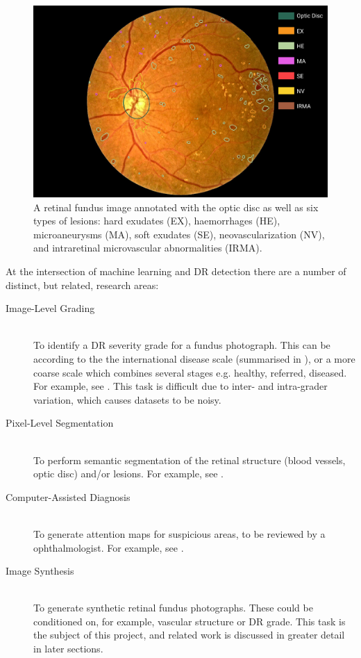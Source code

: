 \begin{figure}
    \centering
    \includegraphics[width=\linewidth]{background/figs/retina.pdf}
    \caption{A retinal fundus image annotated with the optic disc as well as six types of lesions: hard exudates (EX), haemorrhages (HE), microaneurysms (MA), soft exudates (SE), neovascularization (NV), and intraretinal microvascular abnormalities (IRMA).}
    \label{fig:lesions}
\end{figure}
At the intersection of machine learning and DR detection there are a number of distinct, but related, research areas:
\begin{description}
    \item[Image-Level Grading] \hfill \\ To identify a DR severity grade for a fundus photograph. This can be according to the the international disease scale (summarised in ), or a more coarse scale which combines several stages e.g. healthy, referred, diseased. For example, see \cite{Gulshan2016}. This task is difficult due to inter- and intra-grader variation, which causes datasets to be noisy.
    \item[Pixel-Level Segmentation] \hfill \\ To perform semantic segmentation of the retinal structure (blood vessels, optic disc) and/or lesions. For example, see \cite{Xiao_2019}.
    \item[Computer-Assisted Diagnosis] \hfill \\ To generate attention maps for suspicious areas, to be reviewed by a ophthalmologist. For example, see \cite{Wang2017}.
    \item[Image Synthesis] \hfill \\ To generate synthetic retinal fundus photographs. These could be conditioned on, for example, vascular structure or DR grade. This task is the subject of this project, and related work is discussed in greater detail in later sections.
\end{description}
